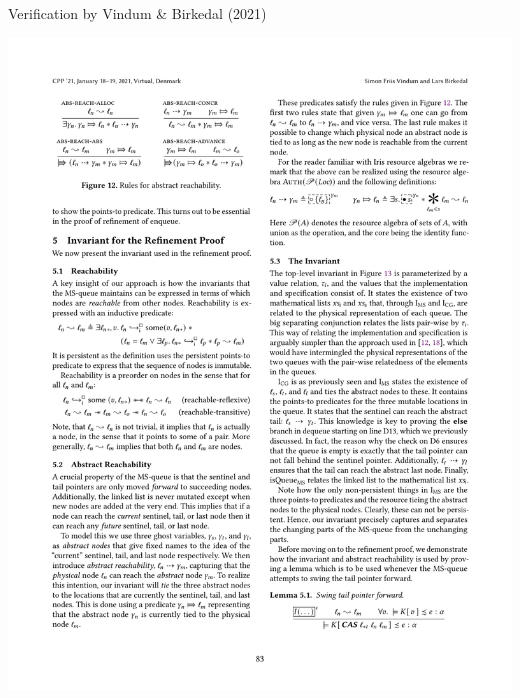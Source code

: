\begin{frame}{Verification by Vindum \& Birkedal (2021)}
\begin{overbox}
    \includegraphics{images/vindum_birkedal_2021_excerpt.pdf}
\end{overbox}
\end{frame}


